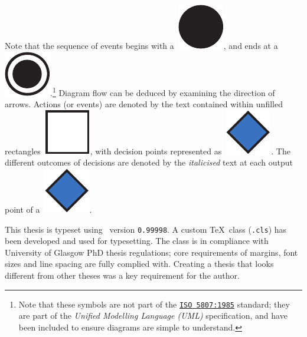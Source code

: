 \begin{preamble}
Note that the sequence of events begins with a~\includegraphics[height=\fontcharht\font`\d]{figures/ch0-example-start.pdf}, and ends at a~\includegraphics[height=\fontcharht\font`\d]{figures/ch0-example-end.pdf}.\footnote{Note that these symbols are not part of the \href{https://www.iso.org/standard/11955.html}{\texttt{ISO 5807:1985}} standard; they are part of the \emph{Unified Modelling Language (UML)} specification, and have been included to ensure diagrams are simple to understand.} Diagram flow can be deduced by examining the direction of arrows. Actions (or events) are denoted by the text contained within unfilled rectangles~\includegraphics[height=\fontcharht\font`\d]{figures/ch0-example-action.pdf}, with decision points represented as~\includegraphics[height=\fontcharht\font`\d]{figures/ch0-example-decision.pdf}. The different outcomes of decisions are denoted by the \emph{italicised} text at each output point of a~\includegraphics[height=\fontcharht\font`\d]{figures/ch0-example-decision.pdf}.

This thesis is typeset using \XeTeX\ version \texttt{0.99998}. A custom \TeX\ class (\texttt{.cls}) has been developed and used for typesetting. The class is in compliance with University of Glasgow PhD thesis regulations; core requirements of margins, font sizes and line spacing are fully complied with. Creating a thesis that looks different from other theses was a key requirement for the author.

\end{preamble}

\newpage
\thispagestyle{empty}
\mbox{}
\newpage
\thispagestyle{empty}
\mbox{}
\newpage